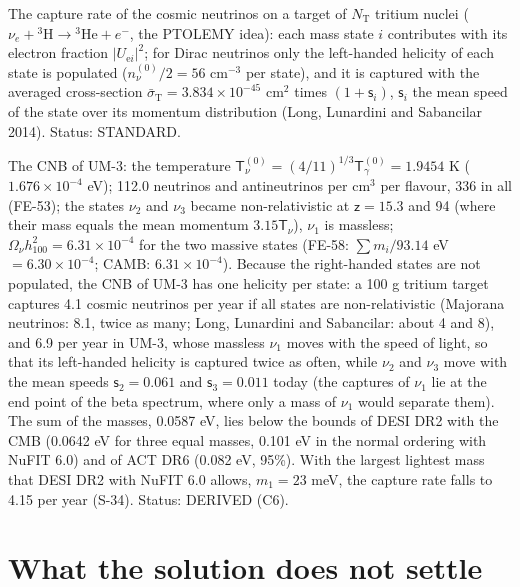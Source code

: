\documentclass[
  10pt,
]{article}
\begin{document}
The capture rate of the cosmic neutrinos on a target of
\(N_{\mathrm{T}}\) tritium nuclei
(\(\nu_e + {}^3\mathrm{H} \to {}^3\mathrm{He} + e^-\), the PTOLEMY
idea): each mass state \(i\) contributes with its electron fraction
\(\lvert U_{\mathrm{e}i}\rvert^2\); for Dirac neutrinos only the
left-handed helicity of each state is populated (\(n_\nu^{(0)}/2 = 56\)
cm\(^{-3}\) per state), and it is captured with the averaged
cross-section \(\bar\sigma_{\mathrm{T}} = 3.834\times10^{-45}\) cm\(^2\)
times \((1 + \mathsf{s}_i)\), \(\mathsf{s}_i\) the mean speed of the
state over its momentum distribution (Long, Lunardini and Sabancilar
2014). Status: STANDARD.

The CNB of UM-3: the temperature
\(\mathsf{T}_\nu^{(0)} = (4/11)^{1/3}\mathsf{T}_\gamma^{(0)} = 1.9454\)
K (\(1.676\times10^{-4}\) eV); 112.0 neutrinos and antineutrinos per
cm\(^3\) per flavour, 336 in all (FE-53); the states \(\nu_2\) and
\(\nu_3\) became non-relativistic at \(\mathsf{z} = 15.3\) and 94 (where
their mass equals the mean momentum \(3.15\mathsf{T}_\nu\)), \(\nu_1\)
is massless; \(\Omega_\nu h_{100}^2 = 6.31\times10^{-4}\) for the two
massive states (FE-58: \(\sum m_i/93.14\) eV \(= 6.30\times10^{-4}\);
CAMB: \(6.31\times10^{-4}\)). Because the right-handed states are not
populated, the CNB of UM-3 has one helicity per state: a 100 g tritium
target captures 4.1 cosmic neutrinos per year if all states are
non-relativistic (Majorana neutrinos: 8.1, twice as many; Long,
Lunardini and Sabancilar: about 4 and 8), and 6.9 per year in UM-3,
whose massless \(\nu_1\) moves with the speed of light, so that its
left-handed helicity is captured twice as often, while \(\nu_2\) and
\(\nu_3\) move with the mean speeds \(\mathsf{s}_2 = 0.061\) and
\(\mathsf{s}_3 = 0.011\) today (the captures of \(\nu_1\) lie at the end
point of the beta spectrum, where only a mass of \(\nu_1\) would
separate them). The sum of the masses, 0.0587 eV, lies below the bounds
of DESI DR2 with the CMB (0.0642 eV for three equal masses, 0.101 eV in
the normal ordering with NuFIT 6.0) and of ACT DR6 (0.082 eV, 95\%).
With the largest lightest mass that DESI DR2 with NuFIT 6.0 allows,
\(m_1 = 23\) meV, the capture rate falls to 4.15 per year (S-34).
Status: DERIVED (C6).

\hypertarget{what-the-solution-does-not-settle}{%
\section{What the solution does not
settle}\label{what-the-solution-does-not-settle}}
\end{document}
